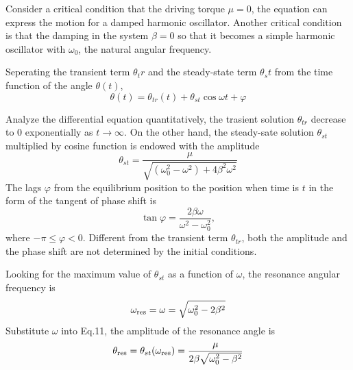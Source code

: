\documentclass[a4paper]{report}
\begin{document}
	Consider a critical condition that the driving torque $\mu=0$, the equation can express the motion for a damped harmonic oscillator. Another critical condition is that the damping in the system $\beta=0$ so that it becomes a simple harmonic oscillator with $\omega_0$, the natural angular frequency.
	
	Seperating the transient term $\theta_tr$ and the steady-state term $\theta_st$ from the time function of the angle $\theta(t)$,
	\begin{equation}
	\theta(t)=\theta_{tr}(t)+\theta_{st}\cos{\omega t+\varphi}
	\end{equation}
	
	Analyze the differential equation quantitatively, the trasient solution $\theta_{tr}$ decrease to 0 exponentially as $t\rightarrow\infty$. On the other hand, the steady-sate solution $\theta_{st}$ multiplied by cosine function is endowed with the amplitude
	\begin{equation}
	\theta_{st}=\dfrac{\mu}{\sqrt{(\omega_0^2-\omega^2)+4\beta^2\omega^2}}
	\end{equation}
	The lags $\varphi$ from the equilibrium position to the position when time is $t$ in the form of the tangent of phase shift is
	\begin{equation}
	\tan{\varphi}=\frac{2\beta\omega}{\omega^2-\omega_0^2},
	\end{equation}
	where $-\pi\leq\varphi<0$. Different from the transient term $\theta_{tr}$, both the amplitude and the phase shift are not determined by the initial conditions.
	
	Looking for the maximum value of $\theta_{st}$ as a function of $\omega$, the resonance angular frequency is
	\begin{equation} \omega_{\rm{res}}=\omega=\sqrt{\omega_0^2-2\beta^2}
	\end{equation}
	Substitute $\omega$ into Eq.11, the amplitude of the resonance angle is
	\begin{equation}
	\theta_{\rm{res}}=\theta_{st}(\omega_{\rm{res}})=\frac{\mu}{2\beta\sqrt{\omega_0^2-\beta^2}}
	\end{equation}
	
\end{document}
